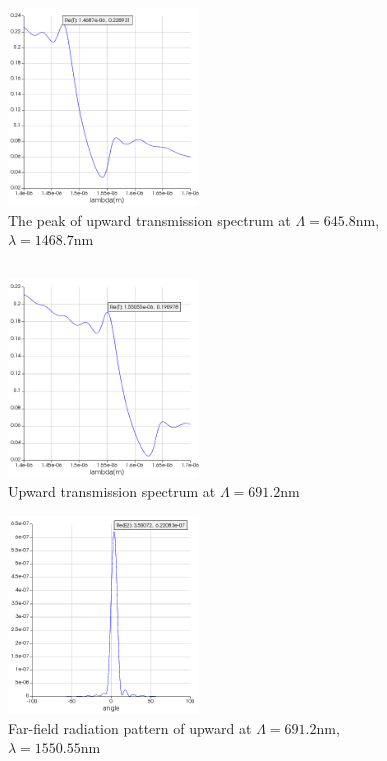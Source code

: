 \documentclass[fontsize=11pt]{scrartcl}
\begin{document}
\begin{figure}[H]
    \centering
     \includegraphics[width=0.45\textwidth]{img/fig3.5.png}
     \caption{The peak of upward transmission spectrum at $\Lambda=645.8\mathrm{nm}$,
     $\lambda=1468.7\mathrm{nm}$}
     \label{fig3.5}
\end{figure}
\subsection{}

\begin{figure}[H]
    \centering
     \includegraphics[width=0.45\textwidth]{img/fig3.6.png}
     \caption{Upward transmission spectrum at $\Lambda=691.2\mathrm{nm}$}
     \label{fig3.6}
\end{figure}
\begin{figure}[H]
    \centering
     \includegraphics[width=0.45\textwidth]{img/fig3.7.png}
     \caption{Far-field radiation pattern of upward at $\Lambda=691.2\mathrm{nm}$,
     $\lambda=1550.55\mathrm{nm}$}
     \label{fig3.7}
\end{figure}
\pagebreak
\end{document}
